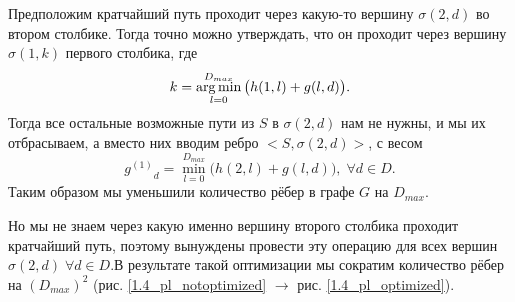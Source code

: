 Предположим кратчайший путь проходит через какую-то вершину $\sigma(2, d)$ во втором столбике. Тогда точно можно утверждать, что он проходит через вершину 
$\sigma(1, k)$ первого столбика, где 
$$k = \operatorname*{arg\,min}\limits_{l=0}^{D_{max}}{\big( h(1, l) + g(l, d) \big) }.$$
Тогда все остальные возможные пути из $S$ в $\sigma(2, d)$ нам не нужны, и мы их отбрасываем, а вместо них вводим ребро $<S, \sigma(2, d) >$, с весом 
$${g^{(1)}}_d = \min\limits_{l=0}^{D_{max}}{\big( h(2, l) + g(l, d) \big) },  \; \forall d \in D.$$ 
Таким образом мы уменьшили количество рёбер в графе $G$ на $D_{max}$.
 
Но мы не знаем через какую именно вершину второго столбика проходит кратчайший путь, поэтому вынуждены провести эту операцию для всех вершин $\sigma(2, d) \; \forall d \in D$.В результате такой оптимизации мы сократим количество рёбер на $(D_{max})^2$ (рис. \ref{1.4_pl_notoptimized} $\rightarrow$ рис. \ref{1.4_pl_optimized}).
